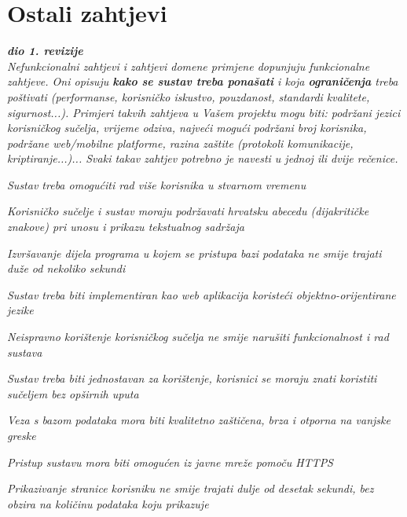 		\section{Ostali zahtjevi}
		
			\textbf{\textit{dio 1. revizije}}\\
		 
			 \textit{Nefunkcionalni zahtjevi i zahtjevi domene primjene dopunjuju funkcionalne zahtjeve. Oni opisuju \textbf{kako se sustav treba ponašati} i koja \textbf{ograničenja} treba poštivati (performanse, korisničko iskustvo, pouzdanost, standardi kvalitete, sigurnost...). Primjeri takvih zahtjeva u Vašem projektu mogu biti: podržani jezici korisničkog sučelja, vrijeme odziva, najveći mogući podržani broj korisnika, podržane web/mobilne platforme, razina zaštite (protokoli komunikacije, kriptiranje...)... Svaki takav zahtjev potrebno je navesti u jednoj ili dvije rečenice.}

			\begin{packed_item}

				\item \textit{Sustav treba omogućiti rad više korisnika u stvarnom vremenu}
				\item \textit{Korisničko sučelje i sustav moraju podržavati hrvatsku abecedu (dijakritičke
							  znakove) pri unosu i prikazu tekstualnog sadržaja}
				\item \textit{Izvršavanje dijela programa u kojem se pristupa bazi podataka ne smije trajati
							  duže od nekoliko sekundi}
				\item \textit{Sustav treba biti implementiran kao web aplikacija koristeći
							  objektno-orijentirane jezike}
				\item \textit{Neispravno korištenje korisničkog sučelja ne smije narušiti funkcionalnost i
							  rad sustava}
				\item \textit{Sustav treba biti jednostavan za korištenje, korisnici se moraju znati koristiti
                              sučeljem bez opširnih uputa}
				\item \textit{Veza s bazom podataka mora biti kvalitetno zaštičena, brza i otporna na
						      vanjske greske}
				\item \textit{Pristup sustavu mora biti omogućen iz javne mreže pomoču HTTPS}
				\item \textit{Prikazivanje stranice korisniku ne smije trajati dulje od desetak sekundi,
							  bez obzira na količinu podataka koju prikazuje}

			\end{packed_item}
			 
	